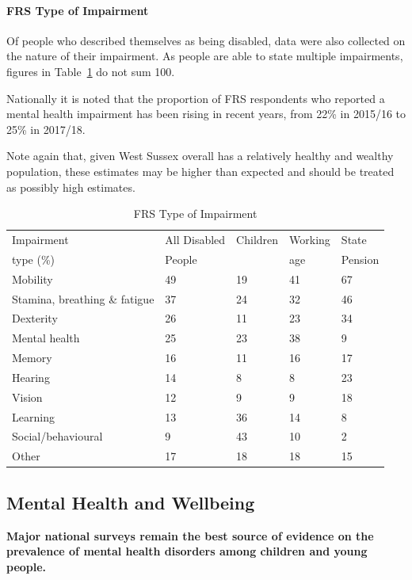 
\paragraph{FRS Type of Impairment} Of people who described themselves as being disabled, data were also collected on the nature of their impairment. As people are able to state multiple impairments, figures in Table~\ref{tab:impairment} do not sum 100.

Nationally it is noted that the proportion of FRS respondents who reported a mental health impairment has been rising in recent years, from 22\% in 2015/16 to 25\% in 2017/18.%

Note again that, given West Sussex overall has a relatively healthy and wealthy population, these estimates may be higher than expected and should be treated as possibly high estimates.

\begin{table}[hbt]
    \caption{FRS Type of Impairment}
    \centering
    \begin{tabular}{lllll}
    \toprule
    Impairment & All Disabled & Children & Working & State \\
    type (\%) & People & \ & age & Pension \\
    \midrule
    Mobility & 49 & 19 & 41 & 67 \\
    Stamina, breathing \& fatigue & 37 & 24 & 32 & 46 \\
    Dexterity & 26 & 11 & 23 & 34 \\
    Mental health & 25 & 23 & 38 & 9 \\
    Memory & 16 & 11 & 16 & 17 \\
    Hearing & 14 & 8 & 8 & 23 \\
    Vision & 12 & 9 & 9 & 18 \\
    Learning & 13 & 36 & 14 & 8 \\
    Social/behavioural & 9 & 43 & 10 & 2 \\
    Other & 17 & 18 & 18 & 15 \\
    \bottomrule
    \end{tabular}
    \label{tab:impairment}
\end{table}

\subsection{Mental Health and Wellbeing}
{\bfseries Major national surveys remain the best source of evidence on the prevalence of mental health disorders among children and young people.}

